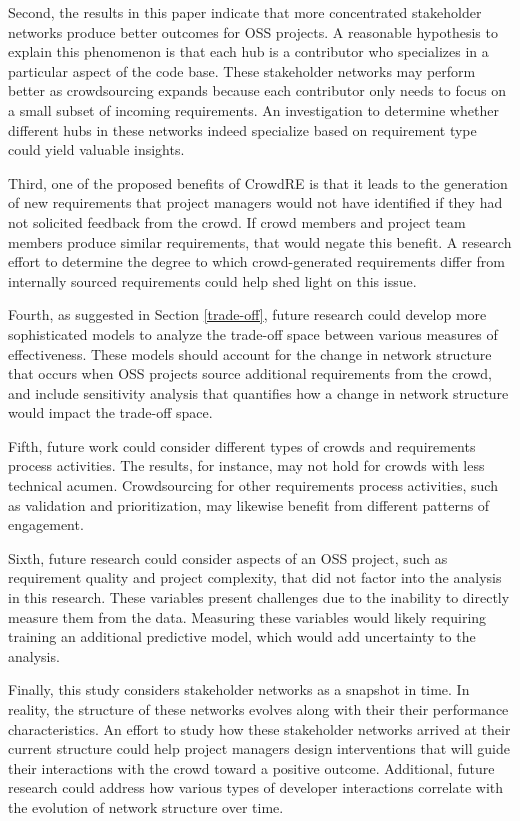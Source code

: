 Second, the results in this paper indicate that more concentrated stakeholder networks produce better outcomes for OSS projects. A reasonable hypothesis to explain this phenomenon is that each hub is a contributor who specializes in a particular aspect of the code base. These stakeholder networks may perform better as crowdsourcing expands because each contributor only needs to focus on a small subset of incoming requirements. An investigation to determine whether different hubs in these networks indeed specialize based on requirement type could yield valuable insights.

Third, one of the proposed benefits of CrowdRE is that it leads to the generation of new requirements that project managers would not have identified if they had not solicited feedback from the crowd. If crowd members and project team members produce similar requirements, that would negate this benefit. A research effort to determine the degree to which crowd-generated requirements differ from internally sourced requirements could help shed light on this issue.

Fourth, as suggested in Section \ref{trade-off}, future research could develop more sophisticated models to analyze the trade-off space between various measures of effectiveness. These models should account for the change in network structure that occurs when OSS projects source additional requirements from the crowd, and include sensitivity analysis that quantifies how a change in network structure would impact the trade-off space.

Fifth, future work could consider different types of crowds and requirements process activities. The results, for instance, may not hold for crowds with less technical acumen. Crowdsourcing for other requirements process activities, such as validation and prioritization, may likewise benefit from different patterns of engagement. 

Sixth, future research could consider aspects of an OSS project, such as requirement quality and project complexity, that did not factor into the analysis in this research. These variables present challenges due to the inability to directly measure them from the data. Measuring these variables would likely requiring training an additional predictive model, which would add uncertainty to the analysis.

Finally, this study considers stakeholder networks as a snapshot in time. In reality, the structure of these networks evolves along with their their performance characteristics. An effort to study how these stakeholder networks arrived at their current structure could help project managers design interventions that will guide their interactions with the crowd toward a positive outcome. Additional, future research could address how various types of developer interactions correlate with the evolution of network structure over time.

